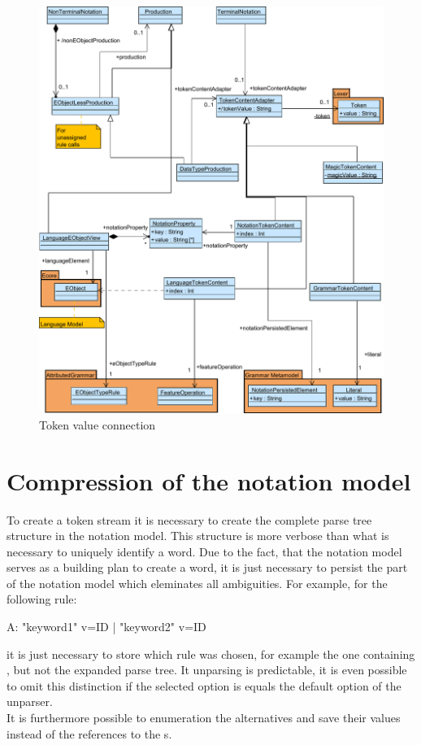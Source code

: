 \begin{figure}
\centering
\includegraphics[scale=0.7]{gfx/ex/Notation_DataLink} 
\caption{Token value connection}
\label{MM:Not:DataLink}
\end{figure}

\section{Compression of the notation model}
To create a token stream it is necessary to create the complete parse tree structure in the notation model. This structure is more verbose than what is necessary to uniquely identify a word. Due to the fact, that the notation model serves as a building plan to create a word, it is just necessary to persist the part of the notation model which eleminates all ambiguities. For example, for the following rule:
\begin{xtxt}
A:  "keyword1" v=ID 
 |  "keyword2" v=ID
\end{xtxt}
it is just necessary to store which rule was chosen, for example the one containing , but not the expanded parse tree. It unparsing is predictable, it is even possible to omit this distinction if the selected option is equals the default option of the unparser.  \\
It is furthermore possible to enumeration the alternatives and save their values instead of the references to the s.

